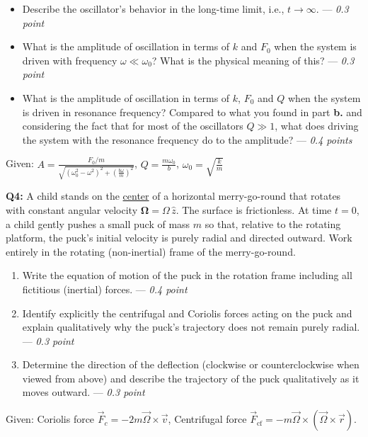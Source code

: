 \documentclass[a4paper,12pt]{article}
\begin{document}
\begin{itemize}
    \item[\textbf{a.}] Describe the oscillator's behavior in the long-time limit, i.e., $t \to \infty$. --- \textit{0.3 point}
    \item[\textbf{b.}] What is the amplitude of oscillation in terms of $k$ and $F_0$ when the system is driven with frequency $\omega \ll \omega_0$? What is the physical meaning of this? --- \textit{0.3 point}
    \item[\textbf{c.}] What is the amplitude of oscillation in terms of $k$, $F_0$ and $Q$ when the system is driven in resonance frequency? Compared to what you found in part \textbf{b.} and considering the fact that for most of the oscillators $Q\gg 1$, what does driving the system with the resonance frequency do to the amplitude? --- \textit{0.4 points}
\end{itemize}
Given: $A = \frac{F_0/m}{\sqrt{\left(\omega_0^2 - \omega^2\right)^2 + \left(\frac{b \omega}{m}\right)^2}}$, $Q = \frac{m \omega_0}{b}$, $\omega_0 = \sqrt{\frac{k}{m}}$


\vspace*{0.1cm}
\textbf{Q4:} A child stands on the \underline{center} of a horizontal merry-go-round that rotates with constant angular velocity $\boldsymbol{\Omega}=\Omega \,\hat{z}$. The surface is frictionless. At time \(t=0\), a child gently pushes a small puck of mass $m$ so that, relative to the rotating platform, the puck’s initial velocity is purely radial and directed outward. Work entirely in the rotating (non-inertial) frame of the merry-go-round.

\begin{enumerate}
    \item[\textbf{a.}] Write the equation of motion of the puck in the rotation frame including all fictitious (inertial) forces. --- \textit{0.4 point}
    \item[\textbf{b.}] Identify explicitly the centrifugal and Coriolis forces acting on the puck and explain qualitatively why the puck’s trajectory does not remain purely radial. --- \textit{0.3 point}
    \item[\textbf{c.}] Determine the direction of the deflection (clockwise or counterclockwise when viewed from above) and describe the trajectory of the puck qualitatively as it moves outward. --- \textit{0.3 point}
\end{enumerate}

Given: Coriolis force $\vec{F}_c = -2m \vec{\Omega} \times \vec{v}$, Centrifugal force $\vec{F}_{\text{cf}} = -m \vec{\Omega} \times (\vec{\Omega} \times \vec{r})$.
    
\end{document}
